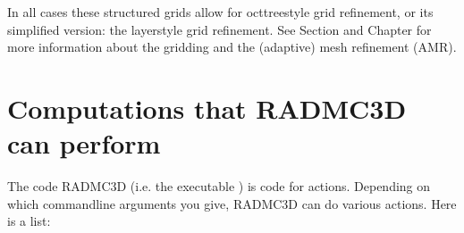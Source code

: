 \documentclass[letterpaper,10pt,english]{sphinxmanual}
\begin{document}
In all cases these structured grids allow for oct\sphinxhyphen{}tree\sphinxhyphen{}style grid refinement, or
its simplified version: the layer\sphinxhyphen{}style grid refinement. See Section
{\hyperref[\detokenize{inputoutputfiles:sec-grid-input}]{}} and Chapter {\hyperref[\detokenize{gridding:chap-gridding}]{}} for more information
about the gridding and the (adaptive) mesh refinement (AMR).


\section{Computations that RADMC\sphinxhyphen{}3D can perform}
\label{\detokenize{basicstructure:computations-that-radmc-3d-can-perform}}\label{\detokenize{basicstructure:sec-actions}}
The code RADMC\sphinxhyphen{}3D (i.e. the executable ) is  code for 
actions. Depending on which command\sphinxhyphen{}line arguments you give, RADMC\sphinxhyphen{}3D can do
various actions. Here is a list:
\end{document}
